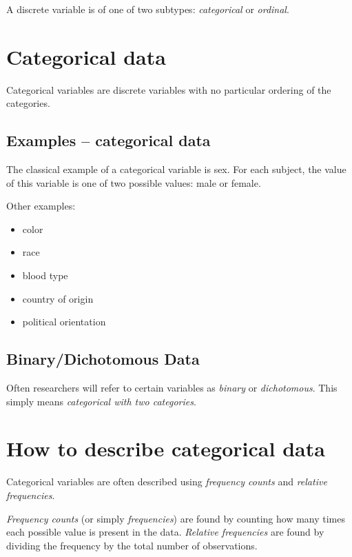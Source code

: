 \documentclass[]{book}
\providecommand{\tightlist}{%
  \setlength{\itemsep}{0pt}\setlength{\parskip}{0pt}}
\theoremstyle{definition}
\theoremstyle{definition}
\theoremstyle{definition}
\theoremstyle{remark}
\begin{document}
A discrete variable is of one of two subtypes: \emph{categorical} or \emph{ordinal}.

\hypertarget{categorical}{%
\section{Categorical data}\label{categorical}}

Categorical variables are discrete variables with no particular ordering of the categories.

\hypertarget{examples-categorical-data}{%
\subsection{Examples -- categorical data}\label{examples-categorical-data}}

The classical example of a categorical variable is sex. For each subject, the value of this variable is one of two possible values: male or female.

Other examples:

\begin{itemize}
\tightlist
\item
  color
\item
  race
\item
  blood type
\item
  country of origin
\item
  political orientation
\end{itemize}

\hypertarget{binarydichotomous-data}{%
\subsection{Binary/Dichotomous Data}\label{binarydichotomous-data}}

Often researchers will refer to certain variables as \emph{binary} or \emph{dichotomous}. This simply means \emph{categorical with two categories}.

\hypertarget{how-to-describe-categorical-data}{%
\section{How to describe categorical data}\label{how-to-describe-categorical-data}}

Categorical variables are often described using \emph{frequency counts} and \emph{relative frequencies}.

\emph{Frequency counts} (or simply \emph{frequencies}) are found by counting how many times each possible value is present in the data. \emph{Relative frequencies} are found by dividing the frequency by the total number of observations.
\end{document}
